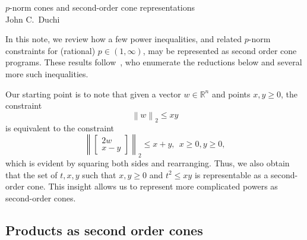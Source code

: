 \documentclass[11pt]{article}
\newcommand{\R}{\mathbb{R}}
\newcommand{\norm}[1]{\left\|{#1}\right\|} %
\newcommand{\ltwo}[1]{\norm{#1}_2} %
\begin{document}
\begin{center}
  {\LARGE $p$-norm cones and second-order cone representations} \\
  \vspace{.2cm}
  {\large John C.\ Duchi} \\
\end{center}

In this note, we review how a few power inequalities, and related $p$-norm
constraints for (rational) $p \in (1, \infty)$, may be represented as second
order cone programs. These results follow~\citet{AlizadehGo01}, who
enumerate the reductions below and several more such inequalities.

Our starting point is to note that given a vector $w \in \R^n$ and points
$x, y \ge 0$, the constraint
\begin{equation*}
  \ltwo{w} \le xy
\end{equation*}
is equivalent to the constraint
\begin{equation}
  \label{eqn:rotated-cone}
  \ltwo{\left[\begin{matrix} 2w \\ x - y \end{matrix}\right]}
  \le x + y,
  ~~ x \ge 0, y \ge 0,
\end{equation}
which is evident by squaring both sides and rearranging.  Thus, we also
obtain that the set of $t, x, y$ such that $x, y \ge 0$ and $t^2 \le xy$ is
representable as a second-order cone. This insight allows us to represent
more complicated powers as second-order cones.

\subsection*{Products as second order cones}
\end{document}
